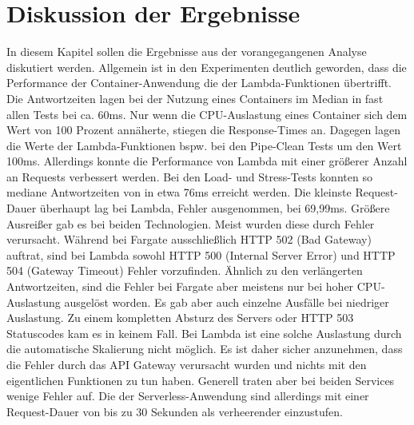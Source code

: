 \chapter{Diskussion der Ergebnisse}
In diesem Kapitel sollen die Ergebnisse aus der vorangegangenen Analyse diskutiert werden.
Allgemein ist in den Experimenten deutlich geworden, dass die Performance der Container-Anwendung die der Lambda-Funktionen übertrifft. Die Antwortzeiten lagen bei der Nutzung eines Containers im Median in fast allen Tests bei ca. 60ms. Nur wenn die CPU-Auslastung eines Container sich dem Wert von 100 Prozent annäherte, stiegen die Response-Times an. Dagegen lagen die Werte der Lambda-Funktionen bspw. bei den Pipe-Clean Tests um den Wert 100ms. Allerdings konnte die Performance von Lambda mit einer größerer Anzahl an Requests verbessert werden. Bei den Load- und Stress-Tests konnten so mediane Antwortzeiten von in etwa 76ms erreicht werden. Die kleinste Request-Dauer überhaupt lag bei Lambda, Fehler ausgenommen, bei 69,99ms. Größere Ausreißer gab es bei beiden Technologien. Meist wurden diese durch Fehler verursacht. Während bei Fargate ausschließlich HTTP 502 (Bad Gateway) auftrat, sind bei Lambda sowohl HTTP 500 (Internal Server Error) und HTTP 504 (Gateway Timeout) Fehler vorzufinden. Ähnlich zu den verlängerten Antwortzeiten, sind die Fehler bei Fargate aber meistens nur bei hoher CPU-Auslastung ausgelöst worden. Es gab aber auch einzelne Ausfälle bei niedriger Auslastung. Zu einem kompletten Absturz des Servers oder HTTP 503 Statuscodes kam es in keinem Fall. 
Bei Lambda ist eine solche Auslastung durch die automatische Skalierung nicht möglich. Es ist daher sicher anzunehmen, dass die Fehler durch das API Gateway verursacht wurden und nichts mit den eigentlichen Funktionen zu tun haben. Generell traten aber bei beiden Services wenige Fehler auf. Die der Serverless-Anwendung sind allerdings mit einer Request-Dauer von bis zu 30 Sekunden als verheerender einzustufen.

